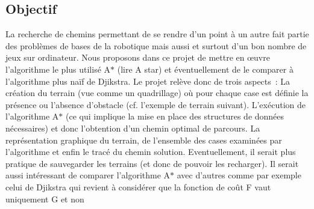 \subsection*{Objectif }

La recherche de chemins permettant de se rendre d’un point à un autre fait partie des problèmes de bases de la robotique mais aussi et surtout d’un bon nombre de jeux sur ordinateur. Nous proposons dans ce projet de mettre en œuvre l’algorithme le plus utilisé A$\ast$ (lire A star) et éventuellement de le comparer à l’algorithme plus naïf de Djikstra. Le projet relève donc de trois aspects \+: La création du terrain (vue comme un quadrillage) où pour chaque case est définie la présence ou l’absence d’obstacle (cf. l’exemple de terrain suivant). L’exécution de l’algorithme A$\ast$ (ce qui implique la mise en place des structures de données nécessaires) et donc l’obtention d’un chemin optimal de parcours. La représentation graphique du terrain, de l’ensemble des cases examinées par l’algorithme et enfin le tracé du chemin solution. Eventuellement, il serait plus pratique de sauvegarder les terrains (et donc de pouvoir les recharger). Il serait aussi intéressant de comparer l’algorithme A$\ast$ avec d’autres comme par exemple celui de Djikstra qui revient à considérer que la fonction de coût F vaut uniquement G et non 